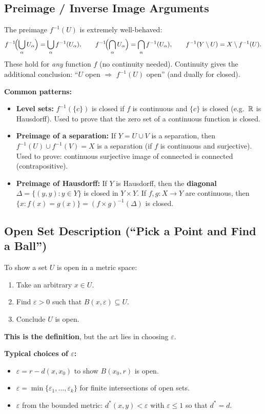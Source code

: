 \documentclass{article}
\begin{document}
\subsection{Preimage / Inverse Image Arguments}
The preimage $f^{-1}(U)$ is extremely well-behaved:
\[
  f^{-1}\!\Bigl(\bigcup_\alpha U_\alpha\Bigr) = \bigcup_\alpha
  f^{-1}(U_\alpha), \qquad
  f^{-1}\!\Bigl(\bigcap_\alpha U_\alpha\Bigr) = \bigcap_\alpha
  f^{-1}(U_\alpha), \qquad
  f^{-1}(Y \setminus U) = X \setminus f^{-1}(U).
\]
These hold for \emph{any} function $f$ (no continuity needed).
Continuity gives the additional conclusion: ``$U$ open $\Rightarrow$
$f^{-1}(U)$ open'' (and dually for closed).

\textbf{Common patterns:}
\begin{itemize}
  \item \textbf{Level sets:} $f^{-1}(\{c\})$ is closed if $f$ is
    continuous and $\{c\}$ is closed (e.g.\ $\mathbb{R}$ is Hausdorff).
    Used to prove that the zero set of a continuous function is closed.
  \item \textbf{Preimage of a separation:} If $Y = U \cup V$ is a
    separation, then $f^{-1}(U) \cup f^{-1}(V) = X$ is a separation
    (if $f$ is continuous and surjective). Used to prove: continuous
    surjective image of connected is connected (contrapositive).
  \item \textbf{Preimage of Hausdorff:} If $Y$ is Hausdorff, then the
    \textbf{diagonal} $\Delta = \{(y,y) : y \in Y\}$ is closed in $Y
    \times Y$. If $f,g : X \to Y$ are continuous, then $\{x : f(x) =
    g(x)\} = (f \times g)^{-1}(\Delta)$ is closed.
\end{itemize}

\subsection{Open Set Description (``Pick a Point and Find a Ball'')}
To show a set $U$ is open in a metric space:
\begin{enumerate}
  \item Take an arbitrary $x \in U$.
  \item Find $\varepsilon > 0$ such that $B(x, \varepsilon) \subseteq U$.
  \item Conclude $U$ is open.
\end{enumerate}
\textbf{This is the definition}, but the art lies in choosing
$\varepsilon$.

\textbf{Typical choices of $\varepsilon$:}
\begin{itemize}
  \item $\varepsilon = r - d(x, x_0)$ to show $B(x_0, r)$ is open.
  \item $\varepsilon = \min\{\varepsilon_1, \ldots, \varepsilon_k\}$
    for finite intersections of open sets.
  \item $\varepsilon$ from the bounded metric: $d^*(x,y) < \varepsilon$
    with $\varepsilon \le 1$ so that $d^* = d$.
\end{itemize}
\end{document}
